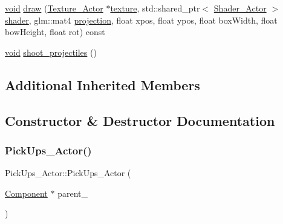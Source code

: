\begin{DoxyCompactItemize}
\item 
\hyperlink{imgui__impl__opengl3__loader_8h_ac668e7cffd9e2e9cfee428b9b2f34fa7}{void} \hyperlink{classPickUps__Actor_ae710e2745950c1b868aba96f7a19637f}{draw} (\hyperlink{classTexture__Actor}{Texture\+\_\+\+Actor} $\ast$\hyperlink{imgui__impl__opengl3__loader_8h_a0b57774cb59b667df4a205ae0b1a50e2}{texture}, std\+::shared\+\_\+ptr$<$ \hyperlink{classShader__Actor}{Shader\+\_\+\+Actor} $>$ \hyperlink{imgui__impl__opengl3__loader_8h_a57b2a96adb1d51204909a82d861e395e}{shader}, glm\+::mat4 \hyperlink{main__menu__state_8cpp_a565d92bfbcc4a481d2d35f3850a382f7}{projection}, float xpos, float ypos, float box\+Width, float bow\+Height, float rot) const
\item 
\hyperlink{imgui__impl__opengl3__loader_8h_ac668e7cffd9e2e9cfee428b9b2f34fa7}{void} \hyperlink{classPickUps__Actor_ae4e6ac905806ed9416438afd91b7f4fc}{shoot\+\_\+projectiles} ()
\end{DoxyCompactItemize}
\subsection*{Additional Inherited Members}


\subsection{Constructor \& Destructor Documentation}
\mbox{\label{classPickUps__Actor_abd87640259cb2e25dc4eae1311e0175e}} 
\subsubsection{\texorpdfstring{Pick\+Ups\+\_\+\+Actor()}{PickUps\_Actor()}}
{\footnotesize\ttfamily Pick\+Ups\+\_\+\+Actor\+::\+Pick\+Ups\+\_\+\+Actor (\begin{DoxyParamCaption}\item[{\hyperlink{classComponent}{Component} $\ast$}]{parent\+\_\+ }\end{DoxyParamCaption})}

\mbox{\label{classPickUps__Actor_ac6093eccf1512b7a66876038496107e5}} 
